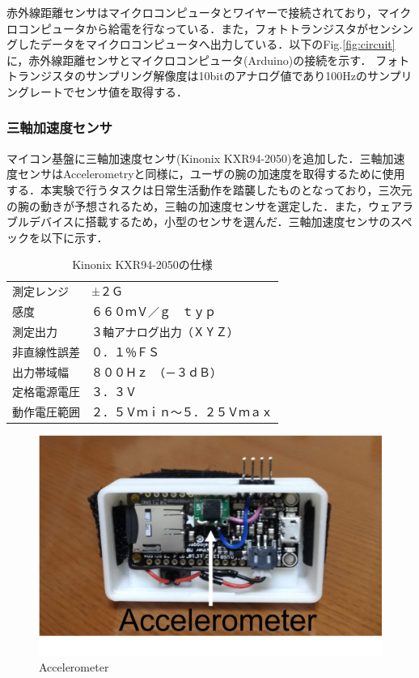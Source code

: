 赤外線距離センサはマイクロコンピュータとワイヤーで接続されており，マイクロコンピュータから給電を行なっている．また，フォトトランジスタがセンシングしたデータをマイクロコンピュータへ出力している．以下のFig.\ref{fig:circuit}に，赤外線距離センサとマイクロコンピュータ(Arduino)の接続を示す．
フォトトランジスタのサンプリング解像度は10bitのアナログ値であり100Hzのサンプリングレートでセンサ値を取得する．

\subsubsection*{三軸加速度センサ}
マイコン基盤に三軸加速度センサ(Kinonix KXR94-2050)を追加した．三軸加速度センサはAccelerometryと同様に，ユーザの腕の加速度を取得するために使用する．本実験で行うタスクは日常生活動作を踏襲したものとなっており，三次元の腕の動きが予想されるため，三軸の加速度センサを選定した．また，ウェアラブルデバイスに搭載するため，小型のセンサを選んだ．三軸加速度センサのスペックを以下に示す．

\begin{table}[H]
  \caption{Kinonix KXR94-2050の仕様}
  \centering
  \begin{tabular}{ll} 
    \hline \hline
測定レンジ&±２Ｇ\\
感度&６６０ｍＶ／ｇ　ｔｙｐ\\
測定出力&３軸アナログ出力（ＸＹＺ）\\
非直線性誤差&０．１％ＦＳ\\
出力帯域幅&８００Ｈｚ　（－３ｄＢ）\\
定格電源電圧&３．３Ｖ\\
動作電圧範囲&２．５Ｖｍｉｎ～５．２５Ｖｍａｘ\\
    \hline
  \end{tabular}
\end{table}

\begin{figure}[H]
  \centering
  \includegraphics[width=0.5\linewidth]{fig/accelerometer}
  \caption{Accelerometer}
  \label{fig:accelerometer}
\end{figure}

